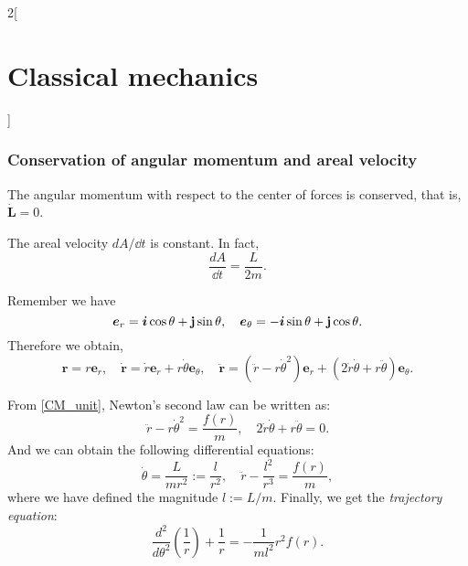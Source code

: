 \documentclass[../../../main.tex]{subfiles}
\begin{document}
\begin{multicols}{2}[\section{Classical mechanics}]
  \subsubsection{Conservation of angular momentum and areal velocity}
  \begin{prop}
    The angular momentum with respect to the center of forces is conserved, that is, $\dot{\boldsymbol{L}}=0$.
  \end{prop}
  \begin{prop}
    The areal velocity $dA/\dd t$ is constant. In fact, $$\frac{dA}{\dd t}=\frac{L}{2m}.$$
  \end{prop}
  \begin{prop}
    Remember we have $$\boldsymbol{e}_r=\boldsymbol{i}\cos\theta+\boldsymbol{\mathrm{j}}\sin\theta,\quad\boldsymbol{e}_\theta=-\boldsymbol{i}\sin\theta+\boldsymbol{\mathrm{j}}\cos\theta.$$ Therefore we obtain,
    \begin{equation}
      \boldsymbol{r}=r\boldsymbol{e}_r,\quad\boldsymbol{\dot{r}}=\dot{r}\boldsymbol{e}_r+r\dot{\theta}\boldsymbol{e}_\theta,\quad\boldsymbol{\ddot{r}}=(\ddot{r}-r\dot{\theta}^2)\boldsymbol{e}_r+(2\dot{r}\dot{\theta}+r\ddot{\theta})\boldsymbol{e}_\theta.
      \label{CM_unit}
    \end{equation}
  \end{prop}
  \begin{prop}
    From \cref{CM_unit}, Newton's second law can be written as: $$\ddot{r}-r\dot{\theta}^2=\frac{f(r)}{m},\quad 2\dot{r}\dot{\theta}+r\ddot{\theta}=0.$$ And we can obtain the following differential equations: $$\dot{\theta}=\frac{L}{m r^2}:=\frac{l}{r^2},\quad\ddot{r}-\frac{l^2}{r^3}=\frac{f(r)}{m},$$ where we have defined the magnitude $l:=L/m$. Finally, we get the \textit{trajectory equation}: $$\frac{d^2}{d\theta^2}\left(\frac{1}{r}\right)+\frac{1}{r}=-\frac{1}{ml^2}r^2f(r).$$
  \end{prop}

\end{multicols}
\end{document}

